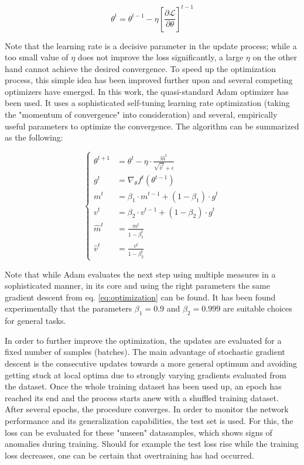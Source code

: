 \begin{equation}
	\theta^t = \theta^{t-1}-\eta\left[\frac{\partial \mathcal{L}}{\partial\theta}\right]^{t-1}
	\label{eq:optimization}
\end{equation}

Note that the learning rate is a decisive parameter in the update process; while a too small value of $\eta$ does not improve the loss significantly, a large $\eta$ on the other hand cannot achieve the desired convergence. To speed up the optimization process, this simple idea has been improved further upon and several competing optimizers have emerged. In this work, the quasi-standard Adam optimizer \cite{Adam_paper} has been used. It uses a sophisticated self-tuning learning rate optimization (taking the "momentum of convergence" into consideration) and several, empirically useful parameters to optimize the convergence. The algorithm can be summarized as the following:

\begin{equation*}
	\begin{cases}
			\theta^{t+1} &= \theta^t - \eta \cdot \frac{\hat{m}^t}{\sqrt{\hat{v}^t}+\epsilon}\\
			g^t &=\nabla_\theta f^t (\theta^{t-1})\\
			m^t&=\beta_1 \cdot m^{t-1} + (1-\beta_1) \cdot g^t \\
			v^t&=\beta_2 \cdot v^{t-1} + (1-\beta_2) \cdot g^t \\
			\hat{m}^t&=\frac{m^t}{1-\beta^t_1}\\
			\hat{v}^t&=\frac{v^t}{1-\beta^t_2}
	\end{cases}
\end{equation*}

Note that while Adam evaluates the next step using multiple measures in a sophisticated manner, in its core and using the right parameters the same gradient descent from eq. \ref{eq:optimization} can be found. It has been found experimentally that the parameters $\beta_1 = 0.9$ and $\beta_2 = 0.999$ are suitable choices for general tasks.

In order to further improve the optimization, the updates are evaluated for a fixed number of samples (batches). The main advantage of stochastic gradient descent is the consecutive updates towards a more general optimum and avoiding getting stuck at local optima due to strongly varying gradients evaluated from the dataset.
Once the whole training dataset has been used up, an epoch has reached its end and the process starts anew with a shuffled training dataset. After several epochs, the procedure converges.
In order to monitor the network performance and its generalization capabilities, the test set is used. For this, the loss can be evaluated for these "unseen" datasamples, which shows signs of anomalies during training. Should for example the test loss rise while the training loss decreases, one can be certain that overtraining has had occurred.

